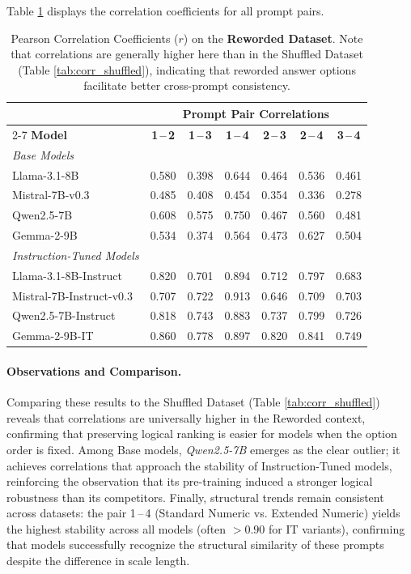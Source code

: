 Table \ref{tab:corr_reworded} displays the correlation coefficients for all prompt pairs.

\begin{table}[H]
    \centering
    \small
    \caption{Pearson Correlation Coefficients ($r$) on the \textbf{Reworded Dataset}. Note that correlations are generally higher here than in the Shuffled Dataset (Table \ref{tab:corr_shuffled}), indicating that reworded answer options facilitate better cross-prompt consistency.}
    \label{tab:corr_reworded}
    \begin{tabular}{lcccccc}
        \toprule
        & \multicolumn{6}{c}{\textbf{Prompt Pair Correlations}} \\
        \cmidrule(lr){2-7}
        \textbf{Model} & \textbf{1\,--\,2} & \textbf{1\,--\,3} & \textbf{1\,--\,4} & \textbf{2\,--\,3} & \textbf{2\,--\,4} & \textbf{3\,--\,4} \\
        \midrule
        \textit{Base Models} & & & & & & \\
        Llama-3.1-8B & 0.580 & 0.398 & 0.644 & 0.464 & 0.536 & 0.461 \\
        Mistral-7B-v0.3 & 0.485 & 0.408 & 0.454 & 0.354 & 0.336 & 0.278 \\
        Qwen2.5-7B & 0.608 & 0.575 & 0.750 & 0.467 & 0.560 & 0.481 \\
        Gemma-2-9B & 0.534 & 0.374 & 0.564 & 0.473 & 0.627 & 0.504 \\
        \midrule
        \textit{Instruction-Tuned Models} & & & & & & \\
        Llama-3.1-8B-Instruct & 0.820 & 0.701 & 0.894 & 0.712 & 0.797 & 0.683 \\
        Mistral-7B-Instruct-v0.3 & 0.707 & 0.722 & 0.913 & 0.646 & 0.709 & 0.703 \\
        Qwen2.5-7B-Instruct & 0.818 & 0.743 & 0.883 & 0.737 & 0.799 & 0.726 \\
        Gemma-2-9B-IT & 0.860 & 0.778 & 0.897 & 0.820 & 0.841 & 0.749 \\
        \bottomrule
    \end{tabular}
\end{table}

\paragraph{Observations and Comparison.}
Comparing these results to the Shuffled Dataset (Table \ref{tab:corr_shuffled}) reveals that correlations are universally higher in the Reworded context, confirming that preserving logical ranking is easier for models when the option order is fixed.
Among Base models, \textit{Qwen2.5-7B} emerges as the clear outlier; it achieves correlations that approach the stability of Instruction-Tuned models, reinforcing the observation that its pre-training induced a stronger logical robustness than its competitors.
Finally, structural trends remain consistent across datasets: the pair 1\,--\,4 (Standard Numeric vs. Extended Numeric) yields the highest stability across all models (often $>0.90$ for IT variants), confirming that models successfully recognize the structural similarity of these prompts despite the difference in scale length.
